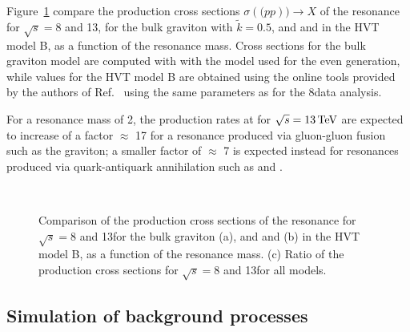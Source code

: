 Figure~\ref{fig:allmodelsXsec} compare the production cross sections $\sigma(\mathrm(pp))\rightarrow X$ of the resonance for $\sqrt{s} = 8$ and 13\TeV,
for the bulk graviton with $\tilde{k} = 0.5$, and \Wpr and \Zpr in the HVT model B, as a function of the resonance mass.
Cross sections for the bulk graviton model are computed with \MADGRAPH{} with the model used for the even generation,
while values for the HVT model B are obtained using the online tools provided by the authors of Ref.~\cite{Pappadopulo:2014qza}
using the same parameters as for the 8\TeV data analysis.

For a resonance mass of 2\TeV, the production rates at for $\sqrt{s} = 13\,\text{Te\hspace{-.08em}V}$ are expected to increase of a factor $\approx$ 17 
for a resonance produced via gluon-gluon fusion such as the graviton; a smaller factor of $\approx$ 7 is expected instead
for resonances produced via quark-antiquark annihilation such as \Wpr and \Zpr.

\begin{figure}[!htb]
\centering
{}
\\
\caption{Comparison of the production cross sections of the resonance for $\sqrt{s} = 8$ and 13\TeV for the bulk graviton (a), and \Wpr and \Zpr (b) in the HVT model B, as a function of the resonance mass.
(c) Ratio of the production cross sections for $\sqrt{s} = 8$ and 13\TeV for all models.}
\label{fig:allmodelsXsec}
\end{figure}

\subsection{Simulation of background processes}\label{subsec:bkgMC}

